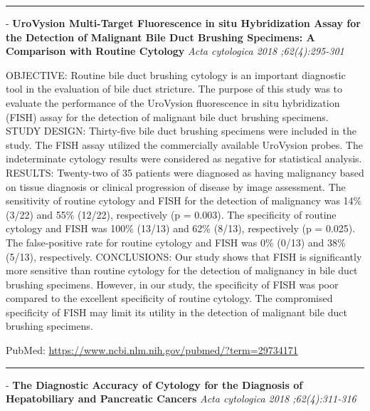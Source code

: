 \documentclass[]{article}
\begin{document}
{}

\begin{center}\rule{0.5\linewidth}{\linethickness}\end{center}

 - \textbf{UroVysion Multi-Target Fluorescence in situ Hybridization
Assay for the Detection of Malignant Bile Duct Brushing Specimens: A
Comparison with Routine Cytology} \emph{Acta cytologica 2018
;62(4):295-301}

OBJECTIVE: Routine bile duct brushing cytology is an important
diagnostic tool in the evaluation of bile duct stricture. The purpose of
this study was to evaluate the performance of the UroVysion fluorescence
in situ hybridization (FISH) assay for the detection of malignant bile
duct brushing specimens. STUDY DESIGN: Thirty-five bile duct brushing
specimens were included in the study. The FISH assay utilized the
commercially available UroVysion probes. The indeterminate cytology
results were considered as negative for statistical analysis. RESULTS:
Twenty-two of 35 patients were diagnosed as having malignancy based on
tissue diagnosis or clinical progression of disease by image assessment.
The sensitivity of routine cytology and FISH for the detection of
malignancy was 14\% (3/22) and 55\% (12/22), respectively (p = 0.003).
The specificity of routine cytology and FISH was 100\% (13/13) and 62\%
(8/13), respectively (p = 0.025). The false-positive rate for routine
cytology and FISH was 0\% (0/13) and 38\% (5/13), respectively.
CONCLUSIONS: Our study shows that FISH is significantly more sensitive
than routine cytology for the detection of malignancy in bile duct
brushing specimens. However, in our study, the specificity of FISH was
poor compared to the excellent specificity of routine cytology. The
compromised specificity of FISH may limit its utility in the detection
of malignant bile duct brushing specimens.

PubMed: \url{https://www.ncbi.nlm.nih.gov/pubmed/?term=29734171}

{}

{}

\begin{center}\rule{0.5\linewidth}{\linethickness}\end{center}

 - \textbf{The Diagnostic Accuracy of Cytology for the Diagnosis of
Hepatobiliary and Pancreatic Cancers} \emph{Acta cytologica 2018
;62(4):311-316}
\end{document}
